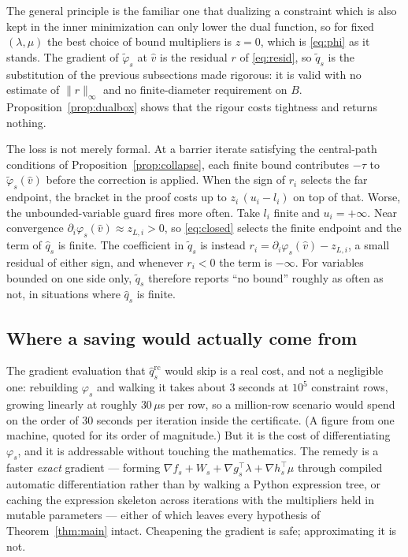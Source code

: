 \documentclass[11pt]{article}
\theoremstyle{plain}
\theoremstyle{remark}
\newcommand{\W}{W}
\newcommand{\vhat}{\hat{v}}
\newcommand{\qhat}{\hat{q}}
\begin{document}
The general principle is the familiar one that dualizing a constraint which is
also kept in the inner minimization can only lower the dual function, so for
fixed $(\lambda,\mu)$ the best choice of bound multipliers is $z = 0$, which is
\eqref{eq:phi} as it stands.  The gradient of $\tilde\varphi_s$ at $\vhat$ is
the residual $r$ of \eqref{eq:resid}, so $\tilde q_s$ is the substitution of
the previous subsections made rigorous: it is valid with no estimate of
$\|r\|_{\infty}$ and no finite-diameter requirement on $B$.
Proposition~\ref{prop:dualbox} shows that the rigour costs tightness and
returns nothing.

The loss is not merely formal.  At a barrier iterate satisfying the central-path
conditions of Proposition~\ref{prop:collapse}, each finite bound
contributes $-\tau$ to $\tilde\varphi_s(\vhat)$ before the correction is
applied.  When the sign of $r_i$ selects the far endpoint, the bracket in the
proof costs up to $z_i\,(u_i - l_i)$ on top of that.  Worse, the
unbounded-variable guard fires more often.  Take $l_i$ finite and
$u_i = +\infty$.  Near convergence
$\partial_i \varphi_s(\vhat) \approx z_{L,i} > 0$, so \eqref{eq:closed} selects
the finite endpoint and the term of $\qhat_s$ is finite.  The coefficient in
$\tilde q_s$ is instead $r_i = \partial_i \varphi_s(\vhat) - z_{L,i}$, a small
residual of either sign, and whenever $r_i < 0$ the term is $-\infty$.  For
variables bounded on one side only, $\tilde q_s$ therefore reports ``no bound''
roughly as often as not, in situations where $\qhat_s$ is finite.

\subsection{Where a saving would actually come from}

The gradient evaluation that $\qhat_s^{\mathrm{rc}}$ would skip is a real cost, and
not a negligible one: rebuilding
$\varphi_s$ and walking it takes about $3$ seconds at $10^{5}$ constraint rows,
growing linearly at roughly $30\,\mu$s per row, so a million-row scenario would
spend on the order of $30$ seconds per iteration inside the certificate.  (A
figure from one machine, quoted for its order of magnitude.)  But it is the
cost of differentiating $\varphi_s$, and it is addressable without touching the
mathematics.  The remedy is a faster \emph{exact} gradient ---
forming $\nabla f_s + \W_s + \nabla g_s^{\top}\lambda + \nabla h_s^{\top}\mu$
through compiled automatic differentiation rather than by walking a Python
expression tree, or caching the expression skeleton across iterations with the
multipliers held in mutable parameters --- either of which leaves every
hypothesis of Theorem~\ref{thm:main} intact.  Cheapening the gradient is safe;
approximating it is not.
\end{document}
